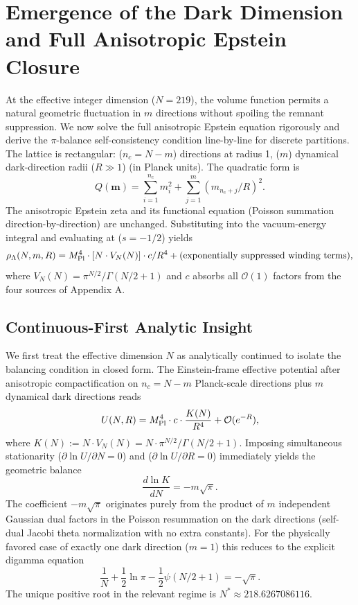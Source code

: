 \documentclass[12pt,a4paper]{article}
\begin{document}
\section{Emergence of the Dark Dimension and Full Anisotropic Epstein Closure}
At the effective integer dimension (\(N=219\)), the volume function permits a natural geometric fluctuation in \(m\) directions without spoiling the remnant suppression. We now solve the full anisotropic Epstein equation rigorously and derive the \(\pi\)-balance self-consistency condition line-by-line for discrete partitions.
The lattice is rectangular: (\(n_c = N - m\)) directions at radius 1, (\(m\)) dynamical dark-direction radii (\(R \gg 1\)) (in Planck units). The quadratic form is
\[
Q(\mathbf{m}) = \sum_{i=1}^{n_c} m_i^2 + \sum_{j=1}^m (m_{n_c+j}/R)^2.
\]
The anisotropic Epstein zeta and its functional equation (Poisson summation direction-by-direction) are unchanged. Substituting into the vacuum-energy integral and evaluating at (\(s = -1/2\)) yields
\[
\rho_\Lambda(N,m,R) = M_{\rm Pl}^4 \cdot [N \cdot V_N(N)] \cdot c / R^4 + (\text{exponentially suppressed winding terms}),
\]
where \(V_N(N) = \pi^{N/2} / \Gamma(N/2 + 1)\) and \(c\) absorbs all \(\mathcal{O}(1)\) factors from the four sources of Appendix A.

\subsection{Continuous-First Analytic Insight}
We first treat the effective dimension \(N\) as analytically continued to isolate the balancing condition in closed form. The Einstein-frame effective potential after anisotropic compactification on \(n_c = N - m\) Planck-scale directions plus \(m\) dynamical dark directions reads
\[
U(N,R) = M_{\rm Pl}^4 \cdot c \cdot \frac{K(N)}{R^4} + \mathcal{O}(e^{-R}),
\]
where \(K(N) := N \cdot V_N(N) = N \cdot \pi^{N/2} / \Gamma(N/2 + 1)\). Imposing simultaneous stationarity (\(\partial \ln U / \partial N = 0\)) and (\(\partial \ln U / \partial R = 0\)) immediately yields the geometric balance
\[
\frac{d \ln K}{dN} = -m\sqrt{\pi}.
\]
The coefficient \(-m\sqrt{\pi}\) originates purely from the product of \(m\) independent Gaussian dual factors in the Poisson resummation on the dark directions (self-dual Jacobi theta normalization with no extra constants). For the physically favored case of exactly one dark direction (\(m=1\)) this reduces to the explicit digamma equation
\[
\frac{1}{N} + \frac{1}{2} \ln \pi - \frac{1}{2} \psi(N/2 + 1) = -\sqrt{\pi}.
\]
The unique positive root in the relevant regime is \(N^* \approx 218.6267086116\).
\end{document}
